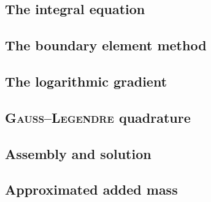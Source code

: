 \subsection{The integral equation}


\subsection{The boundary element method}


\subsection{The logarithmic gradient}


\subsection{\textsc{Gauss}--\textsc{Legendre} quadrature}


\subsection{Assembly and solution}


\subsection{Approximated added mass}

